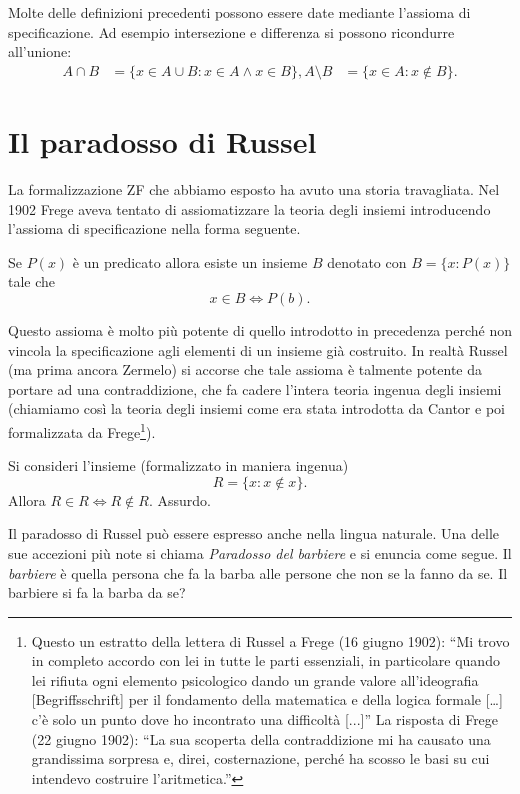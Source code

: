 \documentclass[italian,a4paper,hidelinks,headinclude]{scrartcl}
\begin{document}
Molte delle definizioni precedenti possono essere date mediante l'assioma
di specificazione. Ad esempio intersezione e differenza si possono
ricondurre all'unione:
\begin{align*}
  A \cap B &= \{x\in A \cup B \colon x\in A \land x \in B\},
  A \setminus B &= \{x\in A \colon x \not \in B\}.
\end{align*}


\section{Il paradosso di Russel}

La formalizzazione ZF che abbiamo esposto ha avuto una storia travagliata.
Nel 1902 Frege aveva tentato di assiomatizzare la teoria degli
insiemi introducendo l'assioma di specificazione nella forma seguente.

\begin{axiom}
  Se $P(x)$ è un predicato allora esiste un insieme
  $B$ denotato con $B=\{x\colon P(x)\}$ tale che
  \[
    x\in B \iff P(b).
  \]
\end{axiom}

Questo assioma è molto più potente di quello introdotto in precedenza perché
non vincola la specificazione agli elementi di un insieme già costruito.
In realtà Russel (ma prima ancora Zermelo) si accorse che tale assioma è talmente
potente da portare ad una contraddizione, che fa cadere
l'intera teoria ingenua degli insiemi (chiamiamo così la teoria degli insiemi
come era stata introdotta da Cantor e poi formalizzata da Frege\footnote{%
Questo un estratto della lettera di Russel a Frege (16 giugno 1902):
``Mi trovo in completo accordo con lei in tutte le parti essenziali, in particolare
quando lei rifiuta ogni elemento psicologico dando un grande valore
all'ideografia [Begriffsschrift]
per il fondamento della matematica e della logica formale [\dots] c'è solo
un punto dove ho incontrato una difficoltà [...]''
La risposta di Frege (22 giugno 1902):
``La sua scoperta della contraddizione mi ha causato una grandissima sorpresa e,
direi, costernazione, perché ha scosso le basi su cui intendevo costruire l'aritmetica.''
}).

\begin{paradox}[Russel]
Si consideri l'insieme (formalizzato in maniera ingenua)
\[
  R = \{ x\colon x \not\in x\}.
\]
Allora $R\in R \iff R\not \in R$. Assurdo.
\end{paradox}

Il paradosso di Russel può essere espresso anche nella lingua naturale.
Una delle sue accezioni più note si chiama \emph{Paradosso del barbiere}
e si enuncia come segue. Il \emph{barbiere} è quella persona che fa la barba
alle persone che non se la fanno da se. Il barbiere si fa la barba da se?
\end{document}
